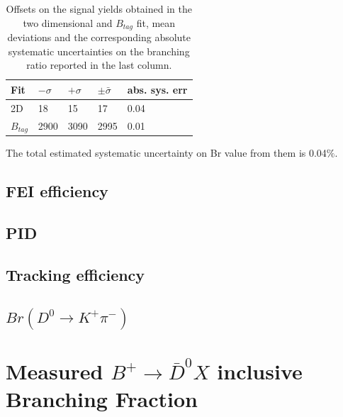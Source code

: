 \begin{table}[H]
  \begin{tabular}{ |p{2.5cm}||p{2cm}| p{2cm}|  p{2cm}|  p{3cm}|}
  \hline
      Fit    &  $- \sigma$ &  $+ \sigma$ & $ \pm \bar{\sigma}$ & abs. sys. err \\
   \hline
   2D        &     18  & 15  & 17 & 0.04\\
   $B_{tag}$ &  2900 &  3090 & 2995 & 0.01\\
   \hline
  \end{tabular}
  \caption{Offsets on the signal yields obtained in the two dimensional and $B_{tag}$ fit, mean deviations 
  and the corresponding absolute systematic uncertainties on the branching ratio reported in the last column.}
  \end{table}
  \vspace{0.2 cm}
  \noindent The total estimated systematic uncertainty on Br value from them is  0.04$\%$.

\subsection{FEI efficiency}
  \subsection{PID}
  \subsection{Tracking efficiency}
  \subsection{$Br(D^0 \rightarrow K^+ \pi^-)$} 

  \newpage
\section{Measured $B^+ \rightarrow \bar{D}^0 X$ inclusive Branching Fraction}\label{sec:chargedControlBRvalues}
  
  

  
  
